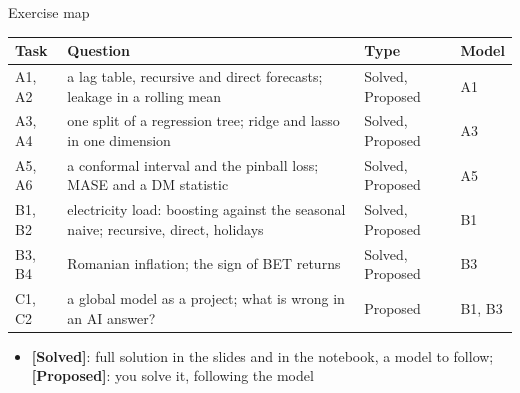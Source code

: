 \begin{frame}{Exercise map}
\itemsize{\small}
\begin{center}
\footnotesize
\begin{tabular}{>{\raggedright\arraybackslash}p{1.1cm}>{\raggedright\arraybackslash}p{7.5cm}>{\raggedright\arraybackslash}p{1.9cm}>{\raggedright\arraybackslash}p{1.4cm}}
\toprule
\textbf{Task} & \textbf{Question} & \textbf{Type} & \textbf{Model} \\
\midrule
A1, A2 & a lag table, recursive and direct forecasts; leakage in a rolling mean & Solved, Proposed & A1 \\
A3, A4 & one split of a regression tree; ridge and lasso in one dimension & Solved, Proposed & A3 \\
A5, A6 & a conformal interval and the pinball loss; MASE and a DM statistic & Solved, Proposed & A5 \\
B1, B2 & electricity load: boosting against the seasonal naive; recursive, direct, holidays & Solved, Proposed & B1 \\
B3, B4 & Romanian inflation; the sign of BET returns & Solved, Proposed & B3 \\
C1, C2 & a global model as a project; what is wrong in an AI answer? & Proposed & B1, B3 \\
\bottomrule
\end{tabular}
\end{center}
\begin{itemize}
    \item \textbf{[Solved]}: full solution in the slides and in the notebook, a model to follow; \textbf{[Proposed]}: you solve it, following the model
\end{itemize}
\end{frame}


